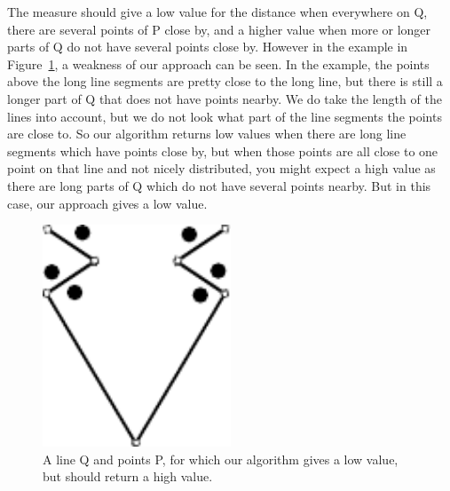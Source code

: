 \documentclass[a4paper,11pt]{article}
\begin{document}
The measure should give a low value for the distance when everywhere on Q, there are several points of P close by, and a higher value when more or longer parts of Q do not have several points close by.
However in the example in Figure~\ref{fig:example1}, a weakness of our approach can be seen. 
In the example, the points above the long line segments are pretty close to the long line, but there is still a longer part of Q that does not have points nearby. 
We do take the length of the lines into account, but we do not look what part of the line segments the points are close to. 
So our algorithm returns low values when there are long line segments which have points close by, but when those points are all close to one point on that line and not nicely distributed, you might expect a high value as there are long parts of Q which do not have several points nearby. But in this case, our approach gives a low value.
\begin{figure}[H]
	\centering
	\includegraphics[width=0.5\textwidth]{img/example1.pdf}
	\caption{A line Q and points P, for which our algorithm gives a low value, but should return a high value.}
	\label{fig:example1}
\end{figure}
\end{document}
